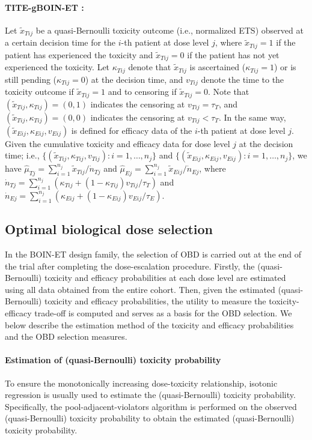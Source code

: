 \paragraph{TITE-gBOIN-ET \citep{takeda:2023}:} Let $\tilde{x}_{Tij}$ be a quasi-Bernoulli toxicity outcome (i.e., normalized ETS) observed at a certain decision time for the $i$-th patient at dose level $j$, where $\tilde{x}_{Tij}=1$ if the patient has experienced the toxicity and $\tilde{x}_{Tij}=0$ if the patient has not yet experienced the toxicity. Let $\kappa_{Tij}$ denote that $\tilde{x}_{Tij}$ is ascertained ($\kappa_{Tij}=1$) or is still pending ($\kappa_{Tij}=0$) at the decision time, and $v_{Tij}$ denote the time to the toxicity outcome if $\tilde{x}_{Tij}=1$ and to censoring if $\tilde{x}_{Tij}=0$. Note that $(\tilde{x}_{Tij},\kappa_{Tij})=(0,1)$ indicates the censoring at $v_{Tij}=\tau_T$, and $(\tilde{x}_{Tij},\kappa_{Tij})=(0,0)$ indicates the censoring at $v_{Tij}<\tau_T$. In the same way, $(\tilde{x}_{Eij},\kappa_{Eij},v_{Eij})$ is defined for efficacy data of the $i$-th patient at dose level $j$. Given the cumulative toxicity and efficacy data for dose level $j$ at the decision time; i.e., $\{(\tilde{x}_{Tij},\kappa_{Tij},v_{Tij}):i=1,\ldots,n_j\}$ and $\{(\tilde{x}_{Eij},\kappa_{Eij},v_{Eij}):i=1,\ldots,n_j\}$, we have $\hat{\mu}_{Tj}=\sum_{i=1}^{n_j}\tilde{x}_{Tij}/\dot{n}_{Tj}$ and $\hat{\mu}_{Ej}=\sum_{i=1}^{n_j}\tilde{x}_{Eij}/\dot{n}_{Ej}$, where $\dot{n}_{Tj}=\sum_{i=1}^{n_j}(\kappa_{Tij}+(1-\kappa_{Tij})v_{Tij}/\tau_T)$ and $\dot{n}_{Ej}=\sum_{i=1}^{n_j}(\kappa_{Eij}+(1-\kappa_{Eij})v_{Eij}/\tau_E)$.

\subsection{Optimal biological dose selection}
In the BOIN-ET design family, the selection of OBD is carried out at the end of the trial after completing the dose-escalation procedure. Firstly, the (quasi-Bernoulli) toxicity and efficacy probabilities at each dose level are estimated using all data obtained from the entire cohort. Then, given the estimated (quasi-Bernoulli) toxicity and efficacy probabilities, the utility to measure the toxicity-efficacy trade-off is computed and serves as a basis for the OBD selection. We below describe the estimation method of the toxicity and efficacy probabilities and the OBD selection measures.

\paragraph{Estimation of (quasi-Bernoulli) toxicity probability} To ensure the monotonically increasing dose-toxicity relationship, isotonic regression \citep{bril:1984} is usually used to estimate the (quasi-Bernoulli) toxicity probability. Specifically, the pool-adjacent-violators algorithm \citep{barlow:1972} is performed on the observed (quasi-Bernoulli) toxicity probability to obtain the estimated (quasi-Bernoulli) toxicity probability.

